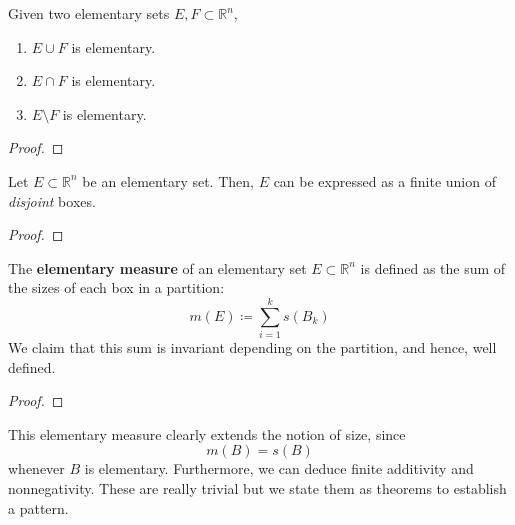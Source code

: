   \begin{lemma}
    Given two elementary sets $E, F \subset \mathbb{R}^n$, 
    \begin{enumerate}
      \item $E \cup F$ is elementary. 
      \item $E \cap F$ is elementary. 
      \item $E \setminus F$ is elementary. 
    \end{enumerate}
  \end{lemma}
  \begin{proof}
    
  \end{proof}

  \begin{lemma} 
    Let $E \subset \mathbb{R}^n$ be an elementary set. Then, $E$ can be expressed as a finite union of \textit{disjoint} boxes. 
  \end{lemma}
  \begin{proof}
    
  \end{proof}

  \begin{definition}
    The \textbf{elementary measure} of an elementary set $E \subset \mathbb{R}^n$ is defined as the sum of the sizes of each box in a partition: 
    \begin{equation}
      m(E) \coloneqq \sum_{i=1}^k s(B_k)
    \end{equation}
    We claim that this sum is invariant depending on the partition, and hence, well defined. 
  \end{definition}
  \begin{proof}
    
  \end{proof}

  This elementary measure clearly extends the notion of size, since 
  \begin{equation}
    m(B) = s(B)
  \end{equation}
  whenever $B$ is elementary. Furthermore, we can deduce finite additivity and nonnegativity. These are really trivial but we state them as theorems to establish a pattern. 

